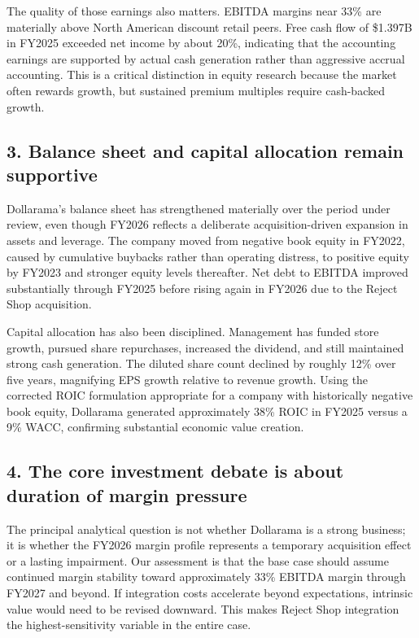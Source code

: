 \documentclass[11pt]{article}
\begin{document}
The quality of those earnings also matters. EBITDA margins near 33\% are materially above North American discount retail peers. Free cash flow of \$1.397B in FY2025 exceeded net income by about 20\%, indicating that the accounting earnings are supported by actual cash generation rather than aggressive accrual accounting. This is a critical distinction in equity research because the market often rewards growth, but sustained premium multiples require cash-backed growth.

\subsection{3. Balance sheet and capital allocation remain supportive}
Dollarama's balance sheet has strengthened materially over the period under review, even though FY2026 reflects a deliberate acquisition-driven expansion in assets and leverage. The company moved from negative book equity in FY2022, caused by cumulative buybacks rather than operating distress, to positive equity by FY2023 and stronger equity levels thereafter. Net debt to EBITDA improved substantially through FY2025 before rising again in FY2026 due to the Reject Shop acquisition.

Capital allocation has also been disciplined. Management has funded store growth, pursued share repurchases, increased the dividend, and still maintained strong cash generation. The diluted share count declined by roughly 12\% over five years, magnifying EPS growth relative to revenue growth. Using the corrected ROIC formulation appropriate for a company with historically negative book equity, Dollarama generated approximately 38\% ROIC in FY2025 versus a 9\% WACC, confirming substantial economic value creation.

\subsection{4. The core investment debate is about duration of margin pressure}
The principal analytical question is not whether Dollarama is a strong business; it is whether the FY2026 margin profile represents a temporary acquisition effect or a lasting impairment. Our assessment is that the base case should assume continued margin stability toward approximately 33\% EBITDA margin through FY2027 and beyond. If integration costs accelerate beyond expectations, intrinsic value would need to be revised downward. This makes Reject Shop integration the highest-sensitivity variable in the entire case.
\end{document}
